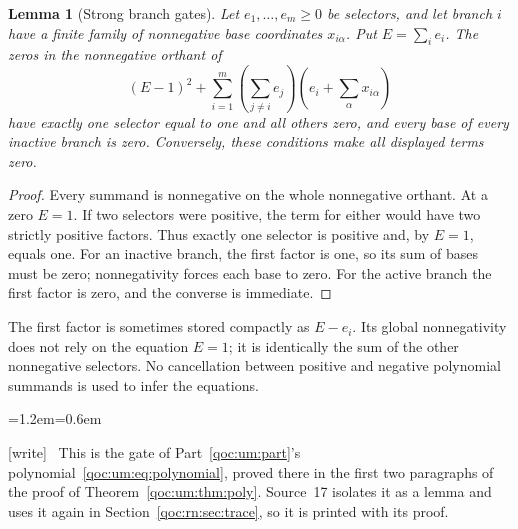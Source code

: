 \documentclass[11pt,letterpaper]{article}
\newtheorem{lemma}[theorem]{Lemma}
\theoremstyle{definition}
\theoremstyle{remark}
\newcommand{\wtag}{\textup{[write]}}
\newenvironment{writenote}{\par\smallskip\begin{list}{}{\leftmargin=1.2em\rightmargin=0.6em}\item[]\small\wtag\ }{\end{list}\smallskip}
\begin{document}
\begin{lemma}[Strong branch gates]
\label{qoc:rn:lem:gates}
Let $e_1,\ldots,e_m\geq0$ be selectors, and let branch $i$ have a finite family of nonnegative base coordinates $x_{i\alpha}$. Put $E=\sum_i e_i$. The zeros in the nonnegative orthant of
\[
 (E-1)^2+\sum_{i=1}^{m}
 \left(\sum_{j\ne i}e_j\right)
 \left(e_i+\sum_\alpha x_{i\alpha}\right)
\]
have exactly one selector equal to one and all others zero, and every base of every inactive branch is zero. Conversely, these conditions make all displayed terms zero.
\end{lemma}
\begin{proof}
Every summand is nonnegative on the whole nonnegative orthant. At a zero $E=1$. If two selectors were positive, the term for either would have two strictly positive factors. Thus exactly one selector is positive and, by $E=1$, equals one. For an inactive branch, the first factor is one, so its sum of bases must be zero; nonnegativity forces each base to zero. For the active branch the first factor is zero, and the converse is immediate.
\end{proof}
The first factor is sometimes stored compactly as $E-e_i$. Its global nonnegativity does not rely on the equation $E=1$; it is identically the sum of the other nonnegative selectors. No cancellation between positive and negative polynomial summands is used to infer the equations.

\begin{writenote}
This is the gate of Part~\ref{qoc:um:part}'s polynomial~\eqref{qoc:um:eq:polynomial}, proved there in the first two paragraphs of the proof of Theorem~\ref{qoc:um:thm:poly}. Source~17 isolates it as a lemma and uses it again in Section~\ref{qoc:rn:sec:trace}, so it is printed with its proof.
\end{writenote}
\end{document}
